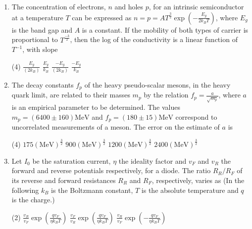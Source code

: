 \begin{enumerate}
	{}
	\begin{tasks}(4)
		\task[\textbf{A.}] $42.0$ to $26.2$
		\task[\textbf{B.}] $24.0$ to $16.8$
		\task[\textbf{C.}] $21.0$ to $10.5$
		\task[\textbf{D.}] $16.8$ to $10.5$
	\end{tasks}
	\item The concentration of electrons, $n$ and holes $p$, for an intrinsic semiconductor at a temperature $T$ can be expressed as $n=p=A T^{\frac{3}{2}} \exp \left(-\frac{E_{g}}{2 k_{B} T}\right)$, where $E_{g}$ is the band gap and $A$ is a constant. If the mobility of both types of carrier is proportional to $T^{\frac{-3}{2}}$, then the log of the conductivity is a linear function of $T^{-1}$, with slope
	{	}
	\begin{tasks}(4)
		\task[\textbf{A.}]$\frac{E_{g}}{\left(2 k_{B}\right)}$
		\task[\textbf{B.}] $\frac{E_{g}}{k_{B}}$
		\task[\textbf{C.}] $\frac{-E_{g}}{\left(2 k_{B}\right)}$
		\task[\textbf{D.}] $\frac{-E_{g}}{k_{B}}$
	\end{tasks}
	\item The decay constants $f_{p}$ of the heavy pseudo-scalar mesons, in the heavy quark limit, are related to their masses $m_{p}$ by the relation $f_{p}=\frac{a}{\sqrt{m_{p}}}$, where $a$ is an empirical parameter to be determined. The values $m_{p}=(6400 \pm 160) \mathrm{MeV}$ and $f_{p}=(180 \pm 15) \mathrm{MeV}$ correspond to uncorrelated measurements of a meson. The error on the estimate of $a$ is
	{	}
	\begin{tasks}(4)
		\task[\textbf{A.}] $175(\mathrm{MeV})^{\frac{3}{2}}$
		\task[\textbf{B.}] $900(\mathrm{MeV})^{\frac{3}{2}}$
		\task[\textbf{C.}] $1200(\mathrm{MeV})^{\frac{3}{2}}$
		\task[\textbf{D.}] $2400(\mathrm{MeV})^{\frac{3}{2}}$
	\end{tasks}
	\item Let $I_{0}$ be the saturation current, $\eta$ the ideality factor and $v_{F}$ and $v_{R}$ the forward and reverse potentials respectively, for a diode. The ratio $R_{R} / R_{F}$ of its reverse and forward resistances $R_{R}$ and $R_{F}$, respectively, varies as (In the following $k_{B}$ is the Boltzmann constant, $T$ is the absolute temperature and $q$ is the charge.)
	{}
	\begin{tasks}(2)
		\task[\textbf{A.}] $\frac{v_{R}}{v_{F}} \exp \left(\frac{q v_{F}}{\eta k_{B} T}\right)$
		\task[\textbf{B.}] $\frac{v_{F}}{v_{R}} \exp \left(\frac{q v_{F}}{\eta k_{B} T}\right)$
		\task[\textbf{C.}]  $\frac{v_{R}}{v_{F}} \exp \left(-\frac{q v_{F}}{\eta k_{B} T}\right)$

\end{tasks}
\end{enumerate}
